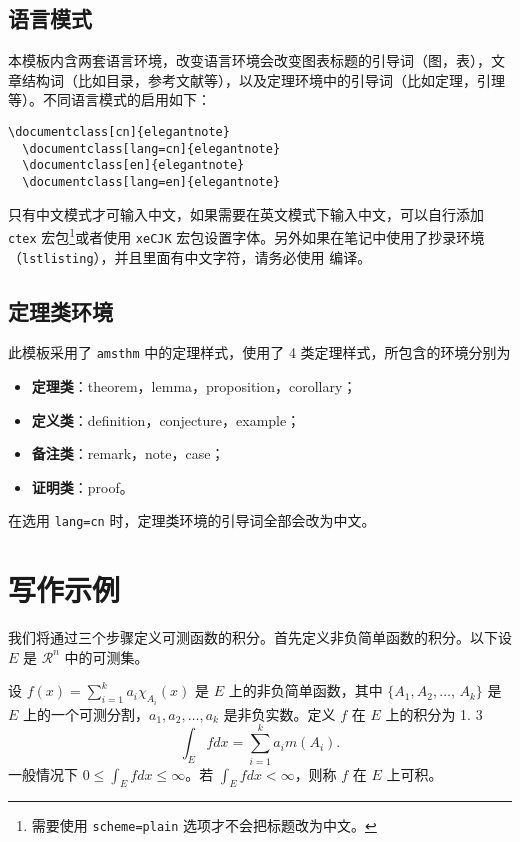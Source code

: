 \documentclass[cn,hazy,blue,screen,14pt]{elegantnote}
\begin{document}
\subsection{语言模式}

本模板内含两套语言环境，改变语言环境会改变图表标题的引导词（图，表），文章结构词（比如目录，参考文献等），以及定理环境中的引导词（比如定理，引理等）。不同语言模式的启用如下：
\begin{lstlisting}[frame=none]  
  \documentclass[cn]{elegantnote} 
  \documentclass[lang=cn]{elegantnote} 
  \documentclass[en]{elegantnote} 
  \documentclass[lang=en]{elegantnote}
\end{lstlisting}

\begin{note}
只有中文模式才可输入中文，如果需要在英文模式下输入中文，可以自行添加 \lstinline{ctex} 宏包\footnote{需要使用 \lstinline{scheme=plain} 选项才不会把标题改为中文。}或者使用 \lstinline{xeCJK} 宏包设置字体。另外如果在笔记中使用了抄录环境（\lstinline{lstlisting}），并且里面有中文字符，请务必使用  编译。
\end{note}


\subsection{定理类环境}

此模板采用了 \lstinline{amsthm} 中的定理样式，使用了 4 类定理样式，所包含的环境分别为
\begin{itemize}
  \item \textbf{定理类}：theorem，lemma，proposition，corollary；
  \item \textbf{定义类}：definition，conjecture，example；
  \item \textbf{备注类}：remark，note，case；
  \item \textbf{证明类}：proof。
\end{itemize}

\begin{remark}
在选用 \lstinline{lang=cn} 时，定理类环境的引导词全部会改为中文。
\end{remark}


\section{写作示例}

我们将通过三个步骤定义可测函数的积分。首先定义非负简单函数的积分。以下设 $E$ 是 $\mathcal{R}^n$ 中的可测集。

\begin{definition}[可积性]
设 $ f(x)=\sum\limits_{i=1}^{k} a_i \chi_{A_i}(x)$ 是 $E$ 上的非负简单函数，其中 $\{A_1,A_2,\ldots$, $A_k\}$ 是 $E$ 上的一个可测分割，$a_1,a_2,\ldots,a_k$ 是非负实数。定义 $f$ 在 $E$ 上的积分为 1. 3
\begin{equation}
   \label{inter}
   \int_{E} f dx = \sum_{i=1}^k a_i m(A_i).
\end{equation}
一般情况下 $0 \leq \int_{E} f dx \leq \infty$。若 $\int_{E} f dx < \infty$，则称 $f$ 在 $E$ 上可积。
\end{definition}
\end{document}

